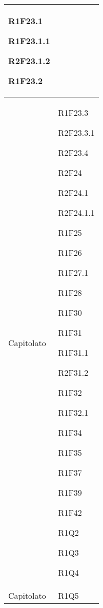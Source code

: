 \begin{center}
\begin{longtable}{|p{44mm}|p{22mm}|}
R1F23.1 \newline

R1F23.1.1 \newline

R2F23.1.2 \newline

R1F23.2
\\
\hline
Capitolato &
R1F23.3 \newline

R2F23.3.1 \newline

R2F23.4 \newline

R2F24 \newline

R2F24.1 \newline

R2F24.1.1 \newline

R1F25 \newline

R1F26 \newline

R1F27.1 \newline

R1F28 \newline

R1F30 \newline

R1F31 \newline

R1F31.1 \newline

R2F31.2 \newline

R1F32 \newline

R1F32.1 \newline

R1F34 \newline

R1F35 \newline

R1F37 \newline

R1F39 \newline

R1F42 \newline

R1Q2 \newline

R1Q3 \newline

R1Q4
\\
\hline
Capitolato &
R1Q5 \newline


\end{longtable}
\end{center}
